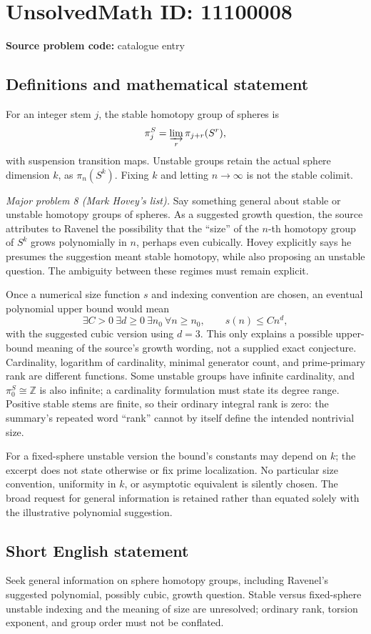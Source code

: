 \documentclass[11pt]{article}
\newcommand{\Z}{\mathbb{Z}}
\begin{document}
\section*{UnsolvedMath ID: 11100008}
\textbf{Source problem code:} catalogue entry
\subsection{Definitions and mathematical statement}
For an integer stem \(j\), the stable homotopy group of spheres is
\[
 \pi_j^S=\varinjlim_r\pi_{j+r}(S^r),
\]
with suspension transition maps. Unstable groups retain the actual sphere dimension \(k\), as \(\pi_n(S^k)\). Fixing \(k\) and letting \(n\to\infty\) is not the stable colimit.

\emph{Major problem 8 (Mark Hovey's list).} Say something general about stable or unstable homotopy groups of spheres. As a suggested growth question, the source attributes to Ravenel the possibility that the ``size'' of the \(n\)-th homotopy group of \(S^k\) grows polynomially in \(n\), perhaps even cubically. Hovey explicitly says he presumes the suggestion meant stable homotopy, while also proposing an unstable question. The ambiguity between these regimes must remain explicit.

Once a numerical size function \(s\) and indexing convention are chosen, an eventual polynomial upper bound would mean
\[
 \exists C>0\ \exists d\geq0\ \exists n_0\ \forall n\geq n_0,
 \qquad s(n)\leq Cn^d,
\]
with the suggested cubic version using \(d=3\). This only explains a possible upper-bound meaning of the source's growth wording, not a supplied exact conjecture. Cardinality, logarithm of cardinality, minimal generator count, and prime-primary rank are different functions. Some unstable groups have infinite cardinality, and \(\pi_0^S\cong\Z\) is also infinite; a cardinality formulation must state its degree range. Positive stable stems are finite, so their ordinary integral rank is zero: the summary's repeated word ``rank'' cannot by itself define the intended nontrivial size.

For a fixed-sphere unstable version the bound's constants may depend on \(k\); the excerpt does not state otherwise or fix prime localization. No particular size convention, uniformity in \(k\), or asymptotic equivalent is silently chosen. The broad request for general information is retained rather than equated solely with the illustrative polynomial suggestion.
\subsection{Short English statement}
Seek general information on sphere homotopy groups, including Ravenel's suggested polynomial, possibly cubic, growth question. Stable versus fixed-sphere unstable indexing and the meaning of size are unresolved; ordinary rank, torsion exponent, and group order must not be conflated.
\end{document}
